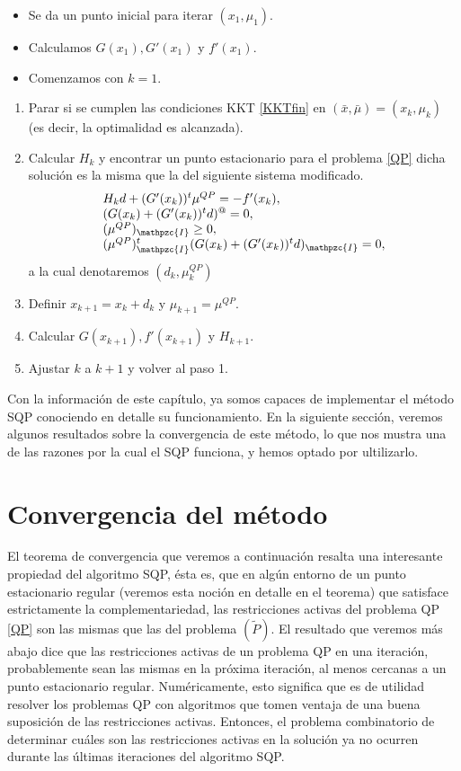 \documentclass[a4paper,10pt]{book}
\newcommand{\bx}{\bar{x}}
\newcommand{\bmu}{\bar{\mu}}
\newcommand{\cI}{\mathpzc{I}}
\begin{document}
 \begin{itemize}
     \item Se da un punto inicial para iterar $(x_1,\mu_1)$.
     \item Calculamos $G(x_1),G'(x_1)$ y $f'(x_1)$.
     \item Comenzamos con $k=1$.
 \end{itemize}
 \begin{enumerate}
 \item Parar si se cumplen las condiciones KKT \eqref{KKTfin} en $(\bx,\bmu)=(x_k,\mu_k)$ (es decir, la optimalidad es alcanzada).
 \item Calcular $H_k$ y encontrar un punto estacionario para el problema \eqref{QP} dicha solución es la misma que la del siguiente sistema modificado.
 \begin{equation}\label{qpmodificado}
     \begin{array}{ll}
 H_kd+(G'(x_k))^t\mu^{QP}=-f'(x_k),\\
 (G(x_k)+(G'(x_k))^td)^@=0,\\
 (\mu^{QP})_\cI\geq0,\\
  (\mu^{QP})_\cI^t(G(x_k)+(G'(x_k))^td)_\cI=0,
 \end{array}
 \end{equation}
 a la cual denotaremos $(d_k,\mu_k^{QP})$
 \item Definir $x_{k+1}=x_k+d_k$ y $\mu_{k+1}=\mu^{QP}$.
 \item Calcular $G(x_{k+1}),f'(x_{k+1})$ y $H_{k+1}$.
 \item Ajustar $k$ a $k+1$ y volver al paso 1.
 \end{enumerate}
 
 Con la información de este capítulo, ya somos capaces de implementar el método SQP conociendo en detalle su funcionamiento. En la siguiente sección, veremos algunos resultados sobre la convergencia de este método, lo que nos mustra una de las razones por la cual el SQP funciona, y hemos optado por ultilizarlo.
 
 \section{Convergencia del método}

El teorema de convergencia que veremos a continuación resalta una interesante propiedad del algoritmo SQP, ésta es, que en algún entorno de un punto estacionario regular (veremos esta noción en detalle en el teorema) que satisface estrictamente la complementariedad, las restricciones activas del problema QP \eqref{QP} son las mismas que las del problema $(\tilde{P})$. El resultado que veremos más abajo dice que las restricciones activas de un problema QP en una iteración, probablemente sean las mismas en la próxima iteración, al menos cercanas a un punto estacionario regular. Numéricamente, esto significa que es de utilidad resolver los problemas QP con algoritmos que tomen ventaja de una buena suposición de las restricciones activas. Entonces, el problema combinatorio de determinar cuáles son las restricciones activas en la solución ya no ocurren durante las últimas iteraciones del algoritmo SQP.
\end{document}

